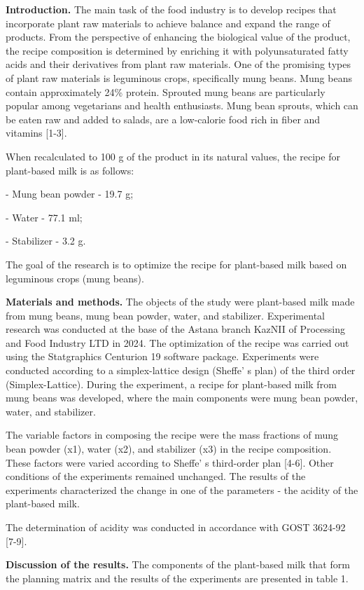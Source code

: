 \begin{multicols}{2}
{\bfseries Introduction.} The main task of the food industry is to develop
recipes that incorporate plant raw materials to achieve balance and
expand the range of products. From the perspective of enhancing the
biological value of the product, the recipe composition is determined by
enriching it with polyunsaturated fatty acids and their derivatives from
plant raw materials. One of the promising types of plant raw materials
is leguminous crops, specifically mung beans. Mung beans contain
approximately 24\% protein. Sprouted mung beans are particularly popular
among vegetarians and health enthusiasts. Mung bean sprouts, which can
be eaten raw and added to salads, are a low-calorie food rich in fiber
and vitamins {[}1-3{]}.

When recalculated to 100 g of the product in its natural values, the
recipe for plant-based milk is as follows:

- Mung bean powder - 19.7 g;

- Water - 77.1 ml;

- Stabilizer - 3.2 g.

The goal of the research is to optimize the recipe for plant-based milk
based on leguminous crops (mung beans).

{\bfseries Materials and methods.} The objects of the study were
plant-based milk made from mung beans, mung bean powder, water, and
stabilizer. Experimental research was conducted at the base of the
Astana branch KazNII of Processing and Food Industry LTD in 2024. The
optimization of the recipe was carried out using the Statgraphics
Centurion 19 software package. Experiments were conducted according to a
simplex-lattice design (Sheffe' s plan) of the third
order (Simplex-Lattice). During the experiment, a recipe for plant-based
milk from mung beans was developed, where the main components were mung
bean powder, water, and stabilizer.

The variable factors in composing the recipe were the mass fractions of
mung bean powder (x1), water (x2), and stabilizer (x3) in the recipe
composition. These factors were varied according to
Sheffe' s third-order plan {[}4-6{]}. Other conditions of
the experiments remained unchanged. The results of the experiments
characterized the change in one of the parameters - the acidity of the
plant-based milk.

The determination of acidity was conducted in accordance with GOST
3624-92 {[}7-9{]}.

{\bfseries Discussion of the results.} The components of the plant-based
milk that form the planning matrix and the results of the experiments
are presented in table 1.
\end{multicols}


